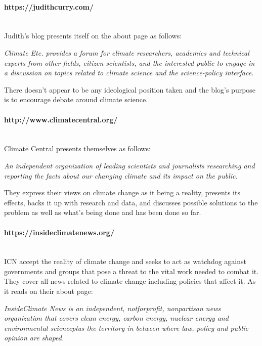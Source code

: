 \documentclass[11pt]{article}
\begin{document}
\paragraph{https://judithcurry.com/} \hspace{0pt} \\
Judith's blog presents itself on the about page as follows:

\begin{displayquote}
\textit{Climate Etc. provides a forum for climate researchers, academics and technical experts
from other fields, citizen scientists, and the interested public to engage in a
discussion on topics related to climate science and the science-policy interface.}
\end{displayquote}

There doesn't appear to be any ideological position taken and the blog's purpose
is to encourage debate around climate science.

\paragraph{http://www.climatecentral.org/} \hspace{0pt} \\
Climate Central presents themselves as follows:

\begin{displayquote}
\textit{An independent organization of leading scientists and journalists researching and
reporting the facts about our changing climate and its impact on the public.}
\end{displayquote}

They express their views on climate change as it being a reality, presents its
effects, backs it up with research and data, and discusses possible solutions to the
problem as well as what's being done and has been done so far.

\paragraph{https://insideclimatenews.org/} \hspace{0pt} \\
ICN accept the reality of climate change and seeks to act as watchdog against
governments and groups that pose a threat to the vital work needed to combat it.
They cover all news related to climate change including policies that affect it.
As it reads on their about page:

\begin{displayquote}
\textit{InsideClimate News is an independent, not\-for\-profit, non\-partisan news organization
that covers clean energy, carbon energy, nuclear energy and environmental science\-plus
the territory in between where law, policy and public opinion are shaped.}
\end{displayquote}
\end{document}
